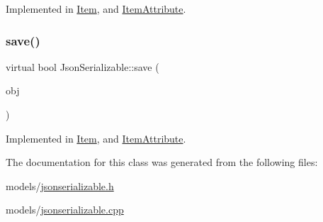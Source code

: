 Implemented in \hyperlink{class_item_aa089e9749b9a19492d45bb02c2135b48}{Item}, and \hyperlink{class_item_attribute_a5504e3f5abf4e2f48eba7893fc6d297e}{Item\+Attribute}.

\mbox{\label{class_json_serializable_a98939816a5704c8d4c46f8571a5ae214}} 
\subsubsection{\texorpdfstring{save()}{save()}}
{\footnotesize\ttfamily virtual bool Json\+Serializable\+::save (\begin{DoxyParamCaption}\item[{Q\+Json\+Object}]{obj }\end{DoxyParamCaption})\hspace{0.3cm}{\ttfamily [pure virtual]}}



Implemented in \hyperlink{class_item_a0922eea7bc56f3f87a134210b56dde2c}{Item}, and \hyperlink{class_item_attribute_a5622c9174b2b4e5c1d37b2e76d4ca2d9}{Item\+Attribute}.



The documentation for this class was generated from the following files\+:\begin{DoxyCompactItemize}
\item 
models/\hyperlink{jsonserializable_8h}{jsonserializable.\+h}\item 
models/\hyperlink{jsonserializable_8cpp}{jsonserializable.\+cpp}\end{DoxyCompactItemize}
